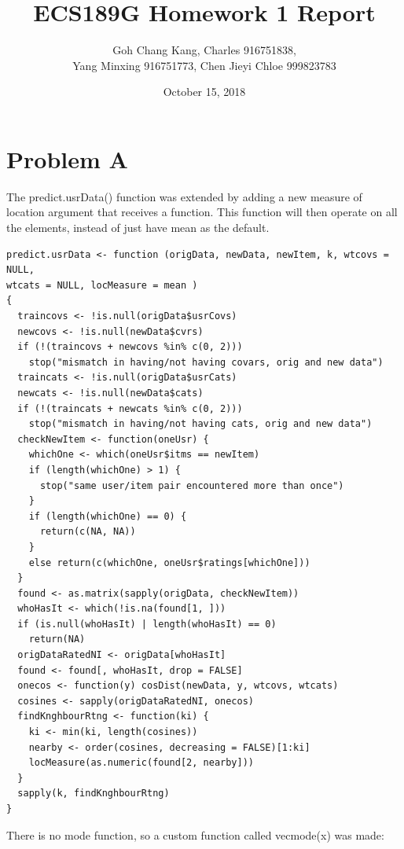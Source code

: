\documentclass{article}
\begin{document}
\begin{titlepage}
\title{ECS189G Homework 1 Report}
\author{Goh Chang Kang, Charles 916751838, \\
Yang Minxing 916751773, Chen Jieyi Chloe 999823783}

\date{October 15, 2018}
\maketitle
\end{titlepage}


\section{Problem A}
The predict.usrData() function was extended by adding a new measure of location argument that receives a function. This function will then operate on all the elements, instead of just have mean as the default. 
\begin{verbatim}
predict.usrData <- function (origData, newData, newItem, k, wtcovs = NULL, 
wtcats = NULL, locMeasure = mean ) 
{
  traincovs <- !is.null(origData$usrCovs)
  newcovs <- !is.null(newData$cvrs)
  if (!(traincovs + newcovs %in% c(0, 2))) 
    stop("mismatch in having/not having covars, orig and new data")
  traincats <- !is.null(origData$usrCats)
  newcats <- !is.null(newData$cats)
  if (!(traincats + newcats %in% c(0, 2))) 
    stop("mismatch in having/not having cats, orig and new data")
  checkNewItem <- function(oneUsr) {
    whichOne <- which(oneUsr$itms == newItem)
    if (length(whichOne) > 1) {
      stop("same user/item pair encountered more than once")
    }
    if (length(whichOne) == 0) {
      return(c(NA, NA))
    }
    else return(c(whichOne, oneUsr$ratings[whichOne]))
  }
  found <- as.matrix(sapply(origData, checkNewItem))
  whoHasIt <- which(!is.na(found[1, ]))
  if (is.null(whoHasIt) | length(whoHasIt) == 0) 
    return(NA)
  origDataRatedNI <- origData[whoHasIt]
  found <- found[, whoHasIt, drop = FALSE]
  onecos <- function(y) cosDist(newData, y, wtcovs, wtcats)
  cosines <- sapply(origDataRatedNI, onecos)
  findKnghbourRtng <- function(ki) {
    ki <- min(ki, length(cosines))
    nearby <- order(cosines, decreasing = FALSE)[1:ki]
    locMeasure(as.numeric(found[2, nearby]))
  }
  sapply(k, findKnghbourRtng)
}

\end{verbatim}

There is no mode function, so a custom function called vecmode(x) was made:
\end{document}
